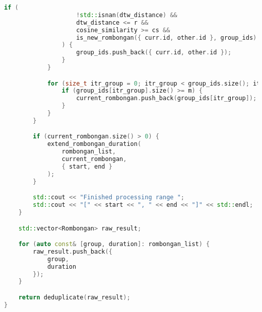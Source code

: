 \begin{lstlisting}[language=C++, caption=Implementasi fungsi \texttt{identify\_rombongan}, label={lamp:identify-rombongan}]
                if (
                    !std::isnan(dtw_distance) &&
                    dtw_distance <= r &&
                    cosine_similarity >= cs &&
                    is_new_rombongan({ curr.id, other.id }, group_ids)
                ) {
                    group_ids.push_back({ curr.id, other.id });
                }
            }

            for (size_t itr_group = 0; itr_group < group_ids.size(); itr_group++) {
                if (group_ids[itr_group].size() >= m) {
                    current_rombongan.push_back(group_ids[itr_group]);
                }
            }
        }

        if (current_rombongan.size() > 0) {
            extend_rombongan_duration(
                rombongan_list,
                current_rombongan,
                { start, end }
            );
        }

        std::cout << "Finished processing range ";
        std::cout << "[" << start << ", " << end << "]" << std::endl;
    }

    std::vector<Rombongan> raw_result;

    for (auto const& [group, duration]: rombongan_list) {
        raw_result.push_back({
            group,
            duration
        });
    }

    return deduplicate(raw_result);
}
\end{lstlisting}